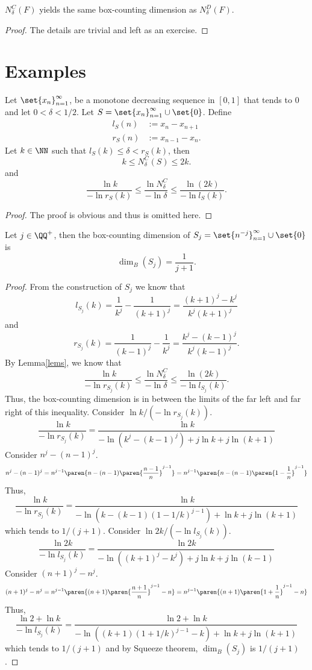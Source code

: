 \begin{thm}
	$N^C_\delta(F)$ yields the same box-counting dimension as $N^D_\delta(F)$.
\end{thm}
\begin{proof}
	The details are trivial and left as an exercise.
\end{proof}

\section{Examples}

\begin{lemma}\label{lems}
	Let $\set{x_n}_{n=1}^\infty$, be a monotone decreasing sequence in $[0,1]$ that tends to 0 and let $0 < \delta < 1/2$.
	Let $S=\set{x_n}_{n=1}^\infty\cup\set{0}$.
	Define
	\begin{align*}
		l_S(n)&:= x_n-x_{n+1}\\
		r_S(n)&:= x_{n-1}-x_n.
	\end{align*}
	Let $k\in\NN$ such that $l_S(k)\leq \delta < r_S(k)$, then
	\[
		k \leq N^C_\delta(S)\leq 2k.
	\]
	and
	\[
		\frac{\ln k}{-\ln r_S(k)}\leq \frac{\ln N^C_\delta}{-\ln\delta}\leq\frac{\ln (2k)}{-\ln l_S(k)}.
	\]
\end{lemma}
\begin{proof}
	The proof is obvious and thus is omitted here.
\end{proof}

\begin{example}
	Let $j\in\QQ^+$, then the box-counting dimension of $S_j=\set{n^{-j}}_{n=1}^\infty\cup\set{0}$ is
	\[
		\dim_B(S_j)=\frac{1}{j+1}.
	\]
\end{example}
\begin{proof}
	From the construction of $S_j$ we know that
	\[
		l_{S_j}(k) = \frac{1}{k^j}-\frac{1}{(k+1)^j} = \frac{(k+1)^j-k^j}{k^j(k+1)^j}
	\]
	and
	\[
		r_{S_j}(k) = \frac{1}{(k-1)^j}-\frac{1}{k^j} = \frac{k^j-(k-1)^j}{k^j(k-1)^j}.
	\]
	By Lemma\autoref{lems}, we know that
	\[
		\frac{\ln k}{-\ln r_{S_j}(k)}\leq \frac{\ln N^C_\delta}{-\ln\delta}\leq\frac{\ln (2k)}{-\ln l_{S_j}(k)}.
	\]
	Thus, the box-counting dimension is in between the limits of the far left and far right of this inequality.
	Consider $\ln k/(-\ln r_{S_j}(k))$.
	\[
		\frac{\ln k}{-\ln r_{S_j}(k)}=\frac{\ln k}{-\ln (k^j-(k-1)^j)+j\ln k +j\ln(k+1)}
	\]
	Consider $n^j-(n-1)^j$.
	\[
		n^j-(n-1)^j=n^{j-1}\paren{ n - (n-1)\paren{\frac{n-1}{n}}^{j-1} }=n^{j-1}\paren{ n - (n-1)\paren{1-\frac{1}{n}}^{j-1} }
	\]
	Thus,
	\[
		\frac{\ln k}{-\ln r_{S_j}(k)}=\frac{\ln k}{-\ln(k-(k-1)(1-1/k)^{j-1})+\ln k +j\ln(k+1)}
	\]
	which tends to $1/(j+1)$.
	Consider $\ln 2k/(-\ln l_{S_j}(k))$.
	\[
		\frac{\ln 2k}{-\ln l_{S_j}(k)}=\frac{\ln 2k}{-\ln ((k+1)^j-k^j)+j\ln k +j\ln(k-1)}
	\]
	Consider $(n+1)^j-n^j$.
	\[
		(n+1)^j-n^j=n^{j-1}\paren{ (n+1)\paren{\frac{n+1}{n}}^{j-1} - n }=n^{j-1}\paren{ (n+1)\paren{1+\frac{1}{n}}^{j-1} - n }
	\]
	Thus,
	\[
		\frac{\ln 2 +\ln k}{-\ln l_{S_j}(k)}=\frac{\ln 2+\ln k}{-\ln((k+1)(1+1/k)^{j-1}-k)+\ln k +j\ln(k+1)}
	\]
	which tends to $1/(j+1)$ and by Squeeze theorem, $\dim_B(S_j)$ is $1/(j+1)$.
\end{proof}


